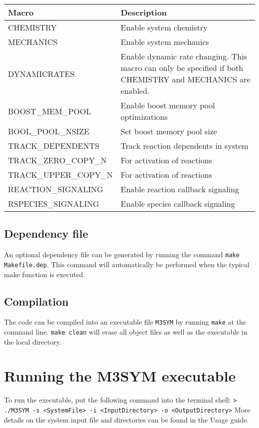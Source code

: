 \documentclass[11pt, oneside]{article}   	%
\begin{document}
\begin{table} [!ht]
\centering
\begin{tabular}{|L{5cm}|L{7.5cm}|}  
\hline
 \textbf{Macro} & \textbf{Description} \\
 \hline
  CHEMISTRY & Enable system chemistry \\
  \hline
  MECHANICS & Enable system mechanics \\ 
  \hline
  DYNAMICRATES & Enable dynamic rate changing. This macro can only be specified if both CHEMISTRY and
  MECHANICS are enabled. \\
  \hline
  BOOST\_MEM\_POOL & Enable boost memory pool optimizations \\
  \hline
   BOOL\_POOL\_NSIZE & Set boost memory pool size \\
  \hline
   TRACK\_DEPENDENTS & Track reaction dependents in system \\
  \hline
    TRACK\_ZERO\_COPY\_N & For activation of reactions \\
  \hline
     TRACK\_UPPER\_COPY\_N & For activation of reactions \\
  \hline
     REACTION\_SIGNALING & Enable reaction callback signaling \\
  \hline
     RSPECIES\_SIGNALING & Enable species callback signaling\\
  \hline
\end{tabular}
\end{table}

	
\subsection {Dependency file}

An optional dependency file can be generated by running the command  \texttt{make Makefile.dep}. This command will automatically be performed when the typical make function is executed.

\subsection{Compilation}

The code can be compiled into an executable file \texttt{M3SYM} by running \texttt{make} at the command line. \texttt{make clean} will erase all object files as well as the executable in the local directory.

\section {Running the M3SYM executable}

To run the executable, put the following command into the terminal shell: \newline \newline\indent \texttt{> ./M3SYM -s <SystemFile> -i <InputDirectory> -o <OutputDirectory>} \newline \newline More details on the system input file and directories can be found in the Usage guide.
\end{document}
